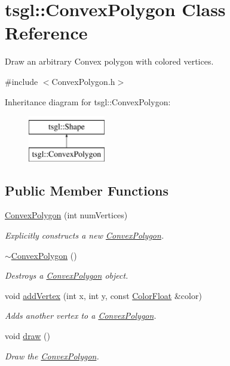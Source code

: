 \hypertarget{classtsgl_1_1_convex_polygon}{}\section{tsgl\+:\+:Convex\+Polygon Class Reference}
\label{classtsgl_1_1_convex_polygon}


Draw an arbitrary Convex polygon with colored vertices.  




{\ttfamily \#include $<$Convex\+Polygon.\+h$>$}

Inheritance diagram for tsgl\+:\+:Convex\+Polygon\+:\begin{figure}[H]
\begin{center}
\leavevmode
\includegraphics[height=2.000000cm]{classtsgl_1_1_convex_polygon}
\end{center}
\end{figure}
\subsection*{Public Member Functions}
\begin{DoxyCompactItemize}
\item 
\hyperlink{classtsgl_1_1_convex_polygon_ae9d826f3b3155fe84016e6efbcbd2b64}{Convex\+Polygon} (int num\+Vertices)
\begin{DoxyCompactList}\small\item\em Explicitly constructs a new \hyperlink{classtsgl_1_1_convex_polygon}{Convex\+Polygon}. \end{DoxyCompactList}\item 
\hyperlink{classtsgl_1_1_convex_polygon_a46a5bde76d6843d47c754a04cc847e64}{$\sim$\+Convex\+Polygon} ()
\begin{DoxyCompactList}\small\item\em Destroys a \hyperlink{classtsgl_1_1_convex_polygon}{Convex\+Polygon} object. \end{DoxyCompactList}\item 
void \hyperlink{classtsgl_1_1_convex_polygon_a60d17a5ac80a796d05dfeff855791cc0}{add\+Vertex} (int x, int y, const \hyperlink{structtsgl_1_1_color_float}{Color\+Float} \&color)
\begin{DoxyCompactList}\small\item\em Adds another vertex to a \hyperlink{classtsgl_1_1_convex_polygon}{Convex\+Polygon}. \end{DoxyCompactList}\item 
void \hyperlink{classtsgl_1_1_convex_polygon_add4d4971a5d22385eebbfe771af916b5}{draw} ()
\begin{DoxyCompactList}\small\item\em Draw the \hyperlink{classtsgl_1_1_convex_polygon}{Convex\+Polygon}. \end{DoxyCompactList}\end{DoxyCompactItemize}
